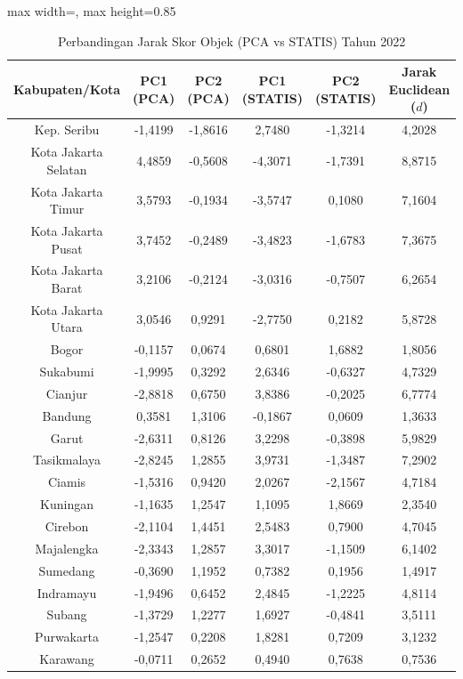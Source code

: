 \begin{table}[H]
\centering
\caption{Perbandingan Jarak Skor Objek (PCA vs STATIS) Tahun 2022} \label{tab:app2jarak_skor_2022}
\begin{adjustbox}{max width=\textwidth, max height=0.85\textheight}
\begin{tabular}{|c|c|c|c|c|c|}
\hline
\textbf{Kabupaten/Kota} & \textbf{PC1 (PCA)} & \textbf{PC2 (PCA)} & \textbf{PC1 (STATIS)} & \textbf{PC2 (STATIS)} & \textbf{Jarak Euclidean ($d$)} \\
\hline
Kep. Seribu & -1,4199 & -1,8616 & 2,7480 & -1,3214 & 4,2028 \\
Kota Jakarta Selatan & 4,4859 & -0,5608 & -4,3071 & -1,7391 & 8,8715 \\
Kota Jakarta Timur & 3,5793 & -0,1934 & -3,5747 & 0,1080 & 7,1604 \\
Kota Jakarta Pusat & 3,7452 & -0,2489 & -3,4823 & -1,6783 & 7,3675 \\
Kota Jakarta Barat & 3,2106 & -0,2124 & -3,0316 & -0,7507 & 6,2654 \\
Kota Jakarta Utara & 3,0546 & 0,9291 & -2,7750 & 0,2182 & 5,8728 \\
Bogor & -0,1157 & 0,0674 & 0,6801 & 1,6882 & 1,8056 \\
Sukabumi & -1,9995 & 0,3292 & 2,6346 & -0,6327 & 4,7329 \\
Cianjur & -2,8818 & 0,6750 & 3,8386 & -0,2025 & 6,7774 \\
Bandung & 0,3581 & 1,3106 & -0,1867 & 0,0609 & 1,3633 \\
Garut & -2,6311 & 0,8126 & 3,2298 & -0,3898 & 5,9829 \\
Tasikmalaya & -2,8245 & 1,2855 & 3,9731 & -1,3487 & 7,2902 \\
Ciamis & -1,5316 & 0,9420 & 2,0267 & -2,1567 & 4,7184 \\
Kuningan & -1,1635 & 1,2547 & 1,1095 & 1,8669 & 2,3540 \\
Cirebon & -2,1104 & 1,4451 & 2,5483 & 0,7900 & 4,7045 \\
Majalengka & -2,3343 & 1,2857 & 3,3017 & -1,1509 & 6,1402 \\
Sumedang & -0,3690 & 1,1952 & 0,7382 & 0,1956 & 1,4917 \\
Indramayu & -1,9496 & 0,6452 & 2,4845 & -1,2225 & 4,8114 \\
Subang & -1,3729 & 1,2277 & 1,6927 & -0,4841 & 3,5111 \\
Purwakarta & -1,2547 & 0,2208 & 1,8281 & 0,7209 & 3,1232 \\
Karawang & -0,0711 & 0,2652 & 0,4940 & 0,7638 & 0,7536 \\

\end{tabular}
\end{adjustbox}
\end{table}
